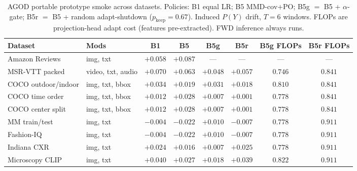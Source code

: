\providecommand{\agodtoprule}{\toprule}
\providecommand{\agodmidrule}{\midrule}
\providecommand{\agodbottomrule}{\bottomrule}

\begin{table}[t]
\centering
\caption{AGOD portable prototype smoke across datasets.
Policies: B1 equal LR; B5 MMD-cov+PO; B5g $=$ B5 + $\alpha$-gate;
B5r $=$ B5 + random adapt-shutdown ($p_{\mathrm{keep}}{=}0.67$).
Induced $P(Y)$ drift, $T{=}6$ windows. FLOPs are projection-head adapt cost
(features pre-extracted). FWD inference always runs.}
\label{tab:agod-portable-smoke-b5r}
\begin{tabular}{llcccccc}
\agodtoprule
Dataset & Mods & B1 & B5 & B5g & B5r & B5g FLOPs & B5r FLOPs \\
\agodmidrule
Amazon Reviews      & img, txt            & $+0.058$ & $+0.087$ & ---      & ---      & ---     & --- \\
MSR-VTT packed      & video, txt, audio   & $+0.070$ & $+0.063$ & $+0.048$ & $+0.057$ & $0.746$ & $0.841$ \\
COCO outdoor/indoor & img, txt, bbox      & $+0.034$ & $+0.019$ & $+0.031$ & $+0.018$ & $0.810$ & $0.841$ \\
COCO time order     & img, txt, bbox      & $+0.012$ & $+0.028$ & $+0.007$ & $+0.001$ & $0.778$ & $0.841$ \\
COCO center split   & img, txt, bbox      & $+0.012$ & $+0.028$ & $+0.007$ & $+0.001$ & $0.778$ & $0.841$ \\
MM train/test       & img, txt            & $-0.004$ & $-0.022$ & $+0.010$ & $-0.007$ & $0.778$ & $0.911$ \\
Fashion-IQ          & img, txt            & $-0.004$ & $-0.022$ & $+0.010$ & $-0.007$ & $0.778$ & $0.911$ \\
Indiana CXR         & img, txt            & $+0.024$ & $+0.016$ & $+0.007$ & $+0.025$ & $0.778$ & $0.911$ \\
Microscopy CLIP     & img, txt            & $+0.040$ & $+0.027$ & $+0.018$ & $+0.039$ & $0.822$ & $0.911$ \\
\agodbottomrule
\end{tabular}
\end{table}


